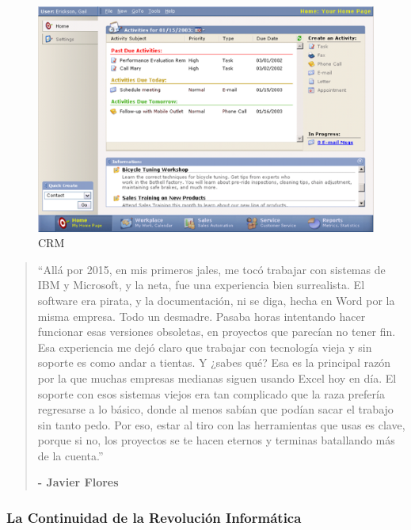 \documentclass[
  10pt,
  letterpaper,
]{book}
\begin{document}
\begin{figure}[H]

{\centering \includegraphics{Img/crm.png}

}

\caption{CRM}

\end{figure}%

\begin{quote}
``Allá por 2015, en mis primeros jales, me tocó trabajar con sistemas de
IBM y Microsoft, y la neta, fue una experiencia bien surrealista. El
software era pirata, y la documentación, ni se diga, hecha en Word por
la misma empresa. Todo un desmadre. Pasaba horas intentando hacer
funcionar esas versiones obsoletas, en proyectos que parecían no tener
fin. Esa experiencia me dejó claro que trabajar con tecnología vieja y
sin soporte es como andar a tientas. Y ¿sabes qué? Esa es la principal
razón por la que muchas empresas medianas siguen usando Excel hoy en
día. El soporte con esos sistemas viejos era tan complicado que la raza
prefería regresarse a lo básico, donde al menos sabían que podían sacar
el trabajo sin tanto pedo. Por eso, estar al tiro con las herramientas
que usas es clave, porque si no, los proyectos se te hacen eternos y
terminas batallando más de la cuenta.''

\textbf{- Javier Flores}
\end{quote}

\subsubsection{La Continuidad de la Revolución
Informática}\label{la-continuidad-de-la-revoluciuxf3n-informuxe1tica}
\end{document}
